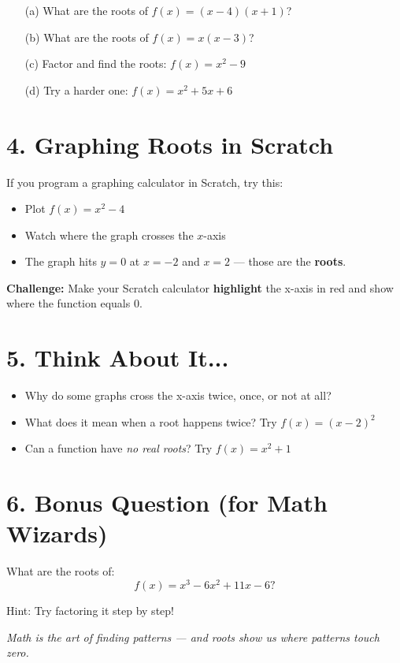 \documentclass[12pt]{article}
\begin{document}
\vspace{0.2cm}
\begin{itemize}
  \item[(a)] What are the roots of $f(x) = (x - 4)(x + 1)$?
  \vspace{1.2cm}
  
  \item[(b)] What are the roots of $f(x) = x(x - 3)$?
  \vspace{1.2cm}
  
  \item[(c)] Factor and find the roots: $f(x) = x^2 - 9$
  \vspace{1.2cm}
  
  \item[(d)] Try a harder one: $f(x) = x^2 + 5x + 6$
  \vspace{1.2cm}
\end{itemize}

\section*{4. Graphing Roots in Scratch}

If you program a graphing calculator in Scratch, try this:

\begin{itemize}
  \item Plot $f(x) = x^2 - 4$
  \item Watch where the graph crosses the $x$-axis
  \item The graph hits $y = 0$ at $x = -2$ and $x = 2$ — those are the \textbf{roots}.
\end{itemize}

\bigskip

\textbf{Challenge:} Make your Scratch calculator \textbf{highlight} the x-axis in red and show where the function equals 0.

\vspace{0.5cm}

\section*{5. Think About It...}

\begin{itemize}
  \item Why do some graphs cross the x-axis twice, once, or not at all?
  \item What does it mean when a root happens twice? Try $f(x) = (x - 2)^2$
  \item Can a function have \textit{no real roots}? Try $f(x) = x^2 + 1$
\end{itemize}

\vspace{0.5cm}

\section*{6. Bonus Question (for Math Wizards)}

What are the roots of:
\[
f(x) = x^3 - 6x^2 + 11x - 6?
\]

Hint: Try factoring it step by step!

\vfill

\centering
\textit{Math is the art of finding patterns — and roots show us where patterns touch zero.}
\end{document}
